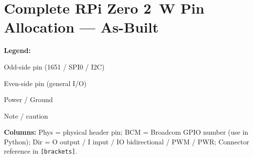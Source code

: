 \documentclass[11pt,a4paper]{article}
\begin{document}
\section{Complete RPi Zero 2~W Pin Allocation --- As-Built}
\label{sec:pinmap}

\textbf{Legend:}
\colorbox{oddcol}{\strut Odd-side pin (1651 / SPI0 / I2C)} \quad
\colorbox{evencol}{\strut Even-side pin (general I/O)} \quad
\colorbox{pwrcol}{\strut Power / Ground} \quad
\colorbox{errcol}{\strut Note / caution}

\smallskip
\textbf{Columns:} Phys = physical header pin;
BCM = Broadcom GPIO number (use in Python);
Dir = O output / I input / IO bidirectional / PWM / PWR;
Connector reference in \texttt{[brackets]}.

\vspace{4pt}
\setlength{\tabcolsep}{3pt}
\renewcommand{\arraystretch}{1.35}
\end{document}
